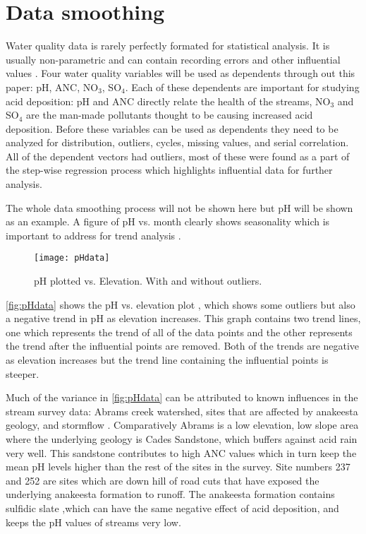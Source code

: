 \section{Data smoothing}%
Water quality data is rarely perfectly formated for statistical analysis.
It is usually  non-parametric and can contain recording errors and other influential values \citep{helsel1992statistical}.
Four water quality variables will be used as dependents through out this paper: pH, ANC, NO$_3$, SO$_4$.
Each of these dependents are important for studying acid deposition: pH and ANC directly relate the health of the streams, NO$_3$ and SO$_4$ are the man-made pollutants thought to be causing increased acid deposition.
Before these variables can be used as dependents they need to be analyzed for distribution, outliers, cycles, missing values, and serial correlation\citep{helsel1992statistical}.
All of the dependent vectors had outliers, most of these were found as a part of the step-wise regression process which highlights influential data for further analysis.

The whole data smoothing process will not be shown here but pH will be shown as an example.
A figure of pH vs. month clearly shows seasonality which is important to address for trend analysis \citep{helsel1992statistical}.

\begin{figure}[h!]
\centering
	\texttt{[image: pHdata]}\\
	\caption{pH plotted vs. Elevation. With and without outliers.}
	\label{fig:pHdata}
\end{figure}

\autoref{fig:pHdata} shows the pH vs. elevation plot , which shows some outliers but also a negative trend in pH as elevation increases.
This graph contains two trend lines, one which represents the trend of all of the data points and the other represents the trend after the influential points are removed. 
Both of the trends are negative as elevation increases but the trend line containing the influential points is steeper. 

Much of the variance in \autoref{fig:pHdata} can be attributed to known influences in the stream survey data: Abrams creek watershed, sites that are affected by anakeesta geology, and stormflow \citep{neff2012influence}.  
Comparatively Abrams is a low elevation, low slope area where the underlying geology is Cades Sandstone, which buffers against acid rain very well. 
This sandstone contributes to high ANC values which in turn keep the mean pH levels higher than the rest of the sites in the survey. 
Site numbers 237 and 252 are sites which are down hill of road cuts that have exposed the underlying anakeesta formation to runoff.  
The anakeesta formation contains sulfidic slate ,which can have the same negative effect of acid deposition,  and keeps the pH values of streams very low.

